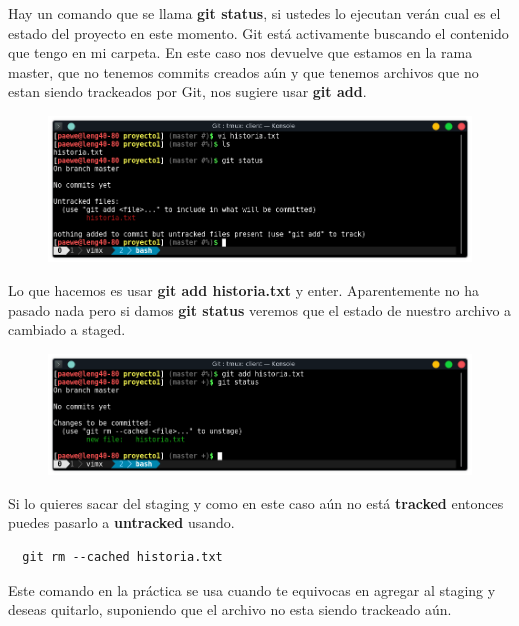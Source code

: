 \documentclass{article}
\begin{document}
Hay un comando que se llama \textbf{git status}, si ustedes lo ejecutan verán
cual es el estado del proyecto en este momento. Git está activamente buscando
el contenido que tengo en mi carpeta. En este caso nos devuelve que estamos en
la rama master, que no tenemos commits creados aún y que tenemos archivos que
no estan siendo trackeados por Git, nos sugiere usar \textbf{git add}.

\newpage

\begin{figure}[h!]
  \centering
  \includegraphics[scale=0.75]{./Pictures/072_untracked.png}
\end{figure}

Lo que hacemos es usar \textbf{git add historia.txt} y enter. Aparentemente no
ha pasado nada pero si damos \textbf{git status} veremos que el estado de
nuestro archivo a cambiado a staged.

\begin{figure}[h!]
  \centering
  \includegraphics[scale=0.75]{./Pictures/073_staged.png}
\end{figure}

Si lo quieres sacar del staging y como en este caso aún no está
\textbf{tracked} entonces puedes pasarlo a \textbf{untracked} usando.

\begin{verbatim}
  git rm --cached historia.txt
\end{verbatim}

Este comando en la práctica se usa cuando te equivocas en agregar al staging y
deseas quitarlo, suponiendo que el archivo no esta siendo trackeado aún.\\
\end{document}
